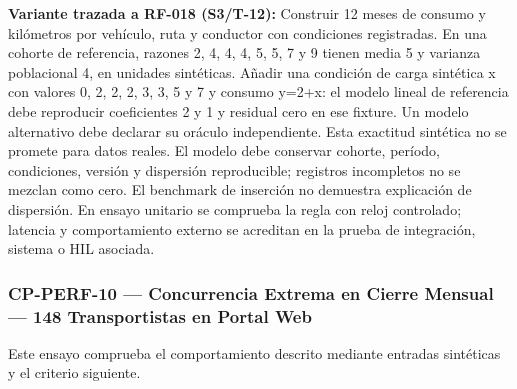 \par\noindent\textbf{Variante trazada a RF-018 (S3/T-12):} Construir 12 meses de consumo y kilómetros por vehículo, ruta y conductor con condiciones registradas. En una cohorte de referencia, razones 2, 4, 4, 4, 5, 5, 7 y 9 tienen media 5 y varianza poblacional 4, en unidades sintéticas. Añadir una condición de carga sintética x con valores 0, 2, 2, 2, 3, 3, 5 y 7 y consumo y=2+x: el modelo lineal de referencia debe reproducir coeficientes 2 y 1 y residual cero en ese fixture. Un modelo alternativo debe declarar su oráculo independiente. Esta exactitud sintética no se promete para datos reales. El modelo debe conservar cohorte, período, condiciones, versión y dispersión reproducible; registros incompletos no se mezclan como cero. El benchmark de inserción no demuestra explicación de dispersión. En ensayo unitario se comprueba la regla con reloj controlado; latencia y comportamiento externo se acreditan en la prueba de integración, sistema o HIL asociada.\par
\subsubsection*{CP-PERF-10 — Concurrencia Extrema en Cierre Mensual — 148 Transportistas en Portal Web}\label{sec:9-cp-perf-10}
Este ensayo comprueba el comportamiento descrito mediante entradas sintéticas y el criterio siguiente.

